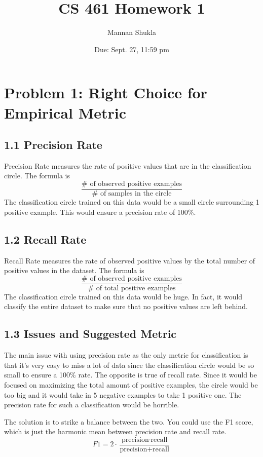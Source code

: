 \documentclass{article}
\title{CS 461 Homework 1}
\date{Due: Sept. 27, 11:59 pm}
\author{Mannan Shukla}
\begin{document}
\maketitle

\section{Problem 1: Right Choice for Empirical Metric}

\subsection{1.1 Precision Rate}
Precision Rate measures the rate of positive values that are in the classification circle. The formula is 
\[
\frac{\# \text{ of observed positive examples}}{\# \text{ of samples in the circle}}
\]
The classification circle trained on this data would be a small circle surrounding 1 positive example. This would ensure a precision rate of 100\%.

\subsection{1.2 Recall Rate}
Recall Rate measures the rate of observed positive values by the total number of positive values in the dataset. The formula is 
\[
\frac{\# \text{ of observed positive examples}}{\# \text{ of total positive examples}}
\]
The classification circle trained on this data would be huge. In fact, it would classify the entire dataset to make sure that no positive values are left behind.

\subsection{1.3 Issues and Suggested Metric}
The main issue with using precision rate as the only metric for classification is that it’s very easy to miss a lot of data since the classification circle would be so small to ensure a 100\% rate. The opposite is true of recall rate. Since it would be focused on maximizing the total amount of positive examples, the circle would be too big and it would take in 5 negative examples to take 1 positive one. The precision rate for such a classification would be horrible.

The solution is to strike a balance between the two. You could use the F1 score, which is just the harmonic mean between precision rate and recall rate. 
\[
F1 = 2 \cdot \frac{\text{precision} \cdot \text{recall}}{\text{precision} + \text{recall}}
\]
\end{document}
